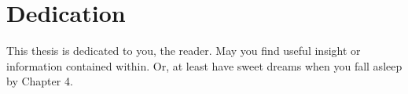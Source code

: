 \chapter*{Dedication}

This thesis is dedicated to you, the reader.
May you find useful insight or information contained within.
Or, at least have sweet dreams when you fall asleep by Chapter 4.